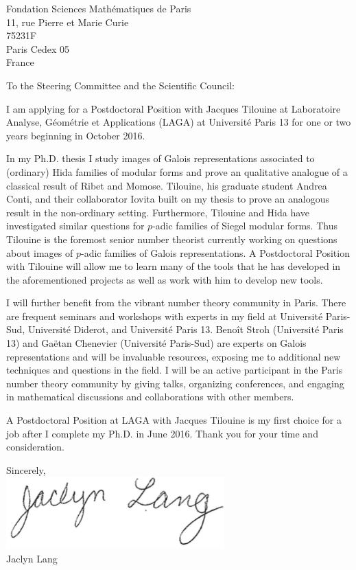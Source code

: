 \documentclass[11pt]{letter}
\def\fsmdp{
{Fondation Sciences Math\'ematiques de Paris\\
11, rue Pierre et Marie Curie \\
75231F \\
Paris Cedex 05\\
France}}
\begin{document}
\begin{letter}\fsmdp
	\opening{To the Steering Committee and the Scientific Council:}
	I am applying for a Postdoctoral Position with Jacques Tilouine at Laboratoire Analyse, G\'eom\'etrie et Applications (LAGA) at Universit\'e Paris 13 for one or two years beginning in October 2016.
	
	In my Ph.D. thesis I study images of Galois representations associated to (ordinary) Hida families of modular forms and prove an qualitative analogue of a classical result of Ribet and Momose.  Tilouine, his graduate student Andrea Conti, and their collaborator Iovita built on my thesis to prove an analogous result in the non-ordinary setting.  Furthermore, Tilouine and Hida have investigated similar questions for $p$-adic families of Siegel modular forms.  Thus Tilouine is the foremost senior number theorist currently working on questions about images of $p$-adic families of Galois representations.  A Postdoctoral Position with Tilouine will allow me to learn many of the tools that he has developed in the aforementioned projects as well as work with him to develop new tools.  
	
	I will further benefit from the vibrant number theory community in Paris.  There are frequent seminars and workshops with experts in my field at Universit\'e Paris-Sud, Universit\'e Diderot, and Universit\'e Paris 13.  Beno\^{i}t Stroh (Universit\'e Paris 13) and Ga\"{e}tan Chenevier (Universit\'e Paris-Sud) are experts on Galois representations and will be invaluable resources, exposing me to additional new techniques and questions in the field.  I will be an active participant in the Paris number theory community by giving talks, organizing conferences, and engaging in mathematical discussions and collaborations with other members.
	
	A Postdoctoral Position at LAGA with Jacques Tilouine is my first choice for a job after I complete my Ph.D. in June 2016.  Thank you for your time and consideration.

	\closing{Sincerely, \\[0.0in] \includegraphics{signature.png}\\ Jaclyn Lang}
\end{letter}
\end{document}
